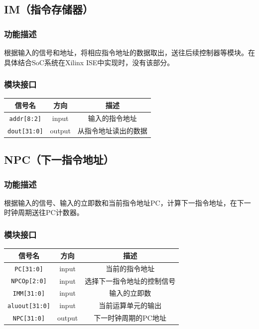 \documentclass[UTF8,a4paper,autofakebold,15pt]{ctexart}
\begin{document}
\subsection{IM（指令存储器）}

\subsubsection{功能描述}

根据输入的信号和地址，将相应指令地址的数据取出，送往后续控制器等模块。在具体结合SoC系统在Xilinx ISE中实现时，没有该部分。

\subsubsection{模块接口}

\begin{center}
	
	
	\begin{tabular}{|c|c|c|}
		\hline
		信号名&方向&描述\\
		\hline
		{\tt addr[8:2]}&input&输入的指令地址\\
		\hline
		{\tt dout[31:0]}&output&从指令地址读出的数据\\
		\hline
	\end{tabular}
\end{center}

\subsection{NPC（下一指令地址）}

\subsubsection{功能描述}

根据输入的信号、输入的立即数和当前指令地址PC，计算下一指令地址，在下一时钟周期送往PC计数器。

\subsubsection{模块接口}

\begin{center}
	
	
	\begin{tabular}{|c|c|c|}
		\hline
		信号名&方向&描述\\
		\hline
		{\tt PC[31:0]}&input&当前的指令地址\\
		\hline
		{\tt NPCOp[2:0]}&input&选择下一指令地址的控制信号\\
		\hline
		{\tt IMM[31:0]}&input&输入的立即数\\
		\hline
		{\tt aluout[31:0]}&input&当前运算单元的输出\\
		\hline
		{\tt NPC[31:0]}&output&下一时钟周期的PC地址\\
		\hline
	\end{tabular}
\end{center}
\end{document}

